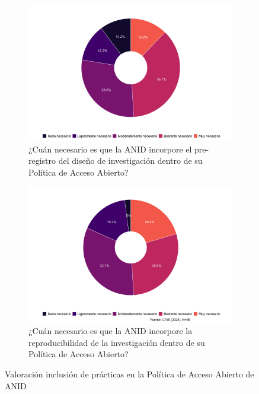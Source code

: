 \documentclass[
  letterpaper,
  DIV=11,
  numbers=noendperiod]{scrreprt}
\begin{document}
\begin{figure}

{\centering 

\begin{figure}

{\centering \includegraphics{paper_files/figure-pdf/fig-vanid-grid-2-1.png}

}

\caption{¿Cuán necesario es que la ANID incorpore el pre-registro del
diseño de investigación dentro de su Política de Acceso Abierto?}

\end{figure}

\begin{figure}

{\centering \includegraphics{paper_files/figure-pdf/fig-vanid-grid-2-2.png}

}

\caption{¿Cuán necesario es que la ANID incorpore la reproducibilidad de
la investigación dentro de su Política de Acceso Abierto?}

\end{figure}

}

\caption{\label{fig-vanid-grid-2}Valoración inclusión de prácticas en la
Política de Acceso Abierto de ANID}

\end{figure}
\end{document}
